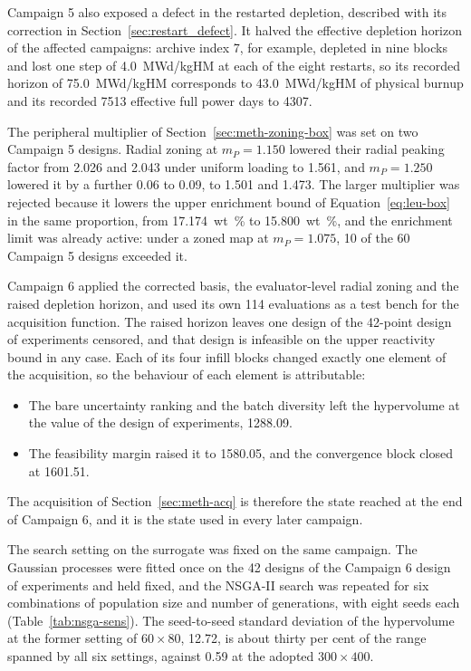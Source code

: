 Campaign 5 also exposed a defect in the restarted depletion, described
with its correction in Section~\ref{sec:restart_defect}. It halved the
effective depletion horizon of the affected campaigns: archive index 7,
for example, depleted in nine blocks and lost one step of
\SI{4.0}{MWd/kgHM} at each of the eight restarts, so its recorded
horizon of \SI{75.0}{MWd/kgHM} corresponds to \SI{43.0}{MWd/kgHM} of
physical burnup and its recorded \num{7513} effective full power days
to \num{4307}.

The peripheral multiplier of Section~\ref{sec:meth-zoning-box} was set
on two Campaign 5 designs. Radial zoning at $m_P = 1.150$ lowered their
radial peaking factor from 2.026 and 2.043 under uniform loading to
1.561, and $m_P = 1.250$ lowered it by a further 0.06 to 0.09, to 1.501
and 1.473. The larger multiplier was rejected because it lowers the
upper enrichment bound of Equation~\eqref{eq:leu-box} in the same
proportion, from \SI{17.174}{wt\%} to \SI{15.800}{wt\%}, and the
enrichment limit was already active: under a zoned map at
$m_P = 1.075$, 10 of the 60 Campaign 5 designs exceeded it.

Campaign 6 applied the corrected basis, the evaluator-level radial zoning and
the raised depletion horizon, and used its own 114 evaluations as a test bench
for the acquisition function. The raised horizon leaves one design of the
42-point design of experiments censored, and that design is infeasible on the
upper reactivity bound in any case. Each of its four infill blocks changed exactly
one element of the acquisition, so the behaviour of each element is
attributable:

\begin{itemize}
  \item The bare uncertainty ranking and the batch diversity left the
        hypervolume at the value of the design of experiments, 1288.09.

  \item The feasibility margin raised it to 1580.05, and the convergence
        block closed at 1601.51.
\end{itemize}

The acquisition of Section~\ref{sec:meth-acq} is therefore the state reached
at the end of Campaign 6, and it is the state used in every later campaign.

The search setting on the surrogate was fixed on the same campaign. The
Gaussian processes were fitted once on the 42 designs of the Campaign 6
design of experiments and held fixed, and the NSGA-II search was repeated
for six combinations of population size and number of generations, with
eight seeds each (Table~\ref{tab:nsga-sens}). The seed-to-seed standard
deviation of the hypervolume at the former setting of $60\times80$,
12.72, is about thirty per cent of the range spanned by all six
settings, against 0.59 at the adopted $300\times400$.

